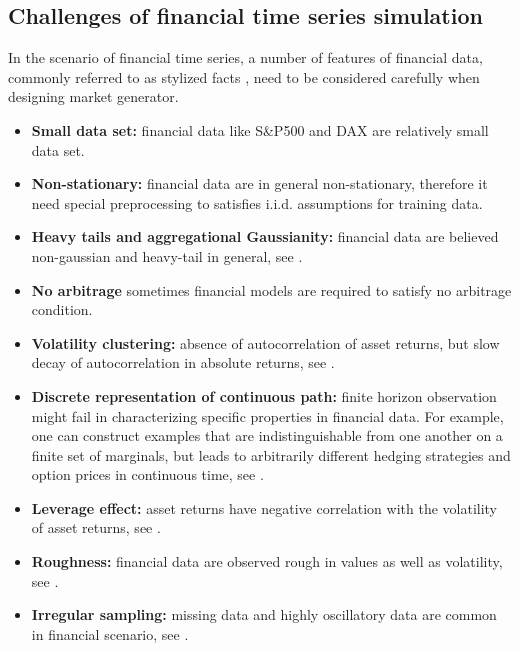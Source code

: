 \documentclass[12pt]{report}
\theoremstyle{definition}
\theoremstyle{remark}
\begin{document}
\subsection{Challenges of financial time series simulation}
In the scenario of financial time series, a number of features of financial data, commonly referred to as stylized facts \cite{cont2001empirical}, need to be considered carefully when designing market generator. 
\begin{itemize}
  \item \textbf{Small data set:} financial data like S\&P500 and DAX are relatively small data set.
  \item \textbf{Non-stationary: } financial data are in general non-stationary, therefore it need special preprocessing to satisfies i.i.d. assumptions for training data. 
  \item \textbf{Heavy tails and aggregational Gaussianity:} financial data are believed non-gaussian and heavy-tail in general, see \cite{amaral2000distribution}. 

  \item \textbf{No arbitrage} sometimes financial models are required to satisfy no arbitrage condition.

  \item \textbf{Volatility clustering: } absence of autocorrelation of asset returns, but slow decay of autocorrelation in absolute returns, see \cite{cont2001empirical}. 

  \item \textbf{Discrete representation of continuous path:} finite horizon observation might fail in characterizing specific properties in financial data. For example, one can construct examples that are indistinguishable from one another on a finite set of marginals, but leads to arbitrarily different hedging strategies and option prices in continuous time, see \cite{brigo2019probability}.

  \item \textbf{Leverage effect:} asset returns have negative correlation with the volatility of asset returns, see \cite{bouchaud2001leverage}.

  \item \textbf{Roughness:} financial data are observed rough in values as well as volatility, see \cite{gatheral2018volatility}.

  \item \textbf{Irregular sampling:} missing data and highly oscillatory data are common in financial scenario, see \cite{kidger2020neural}.
\end{itemize}
\end{document}
